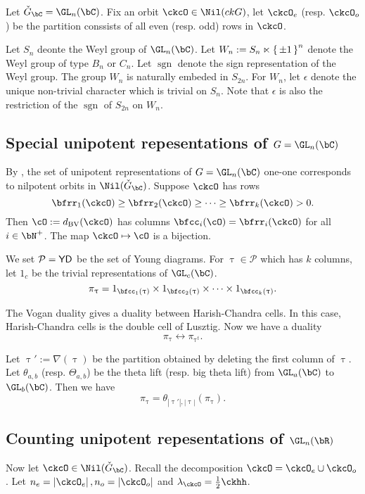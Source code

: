 \documentclass[12pt,a4paper]{amsart}
\def\abs#1{\left|{#1}\right|}
\newcommand{\CP}{{\mathcal {P}}}
\newcommand{\sgn}{\operatorname{sgn}}
\def\DD{\nabla}
\numberwithin{equation}{section}
\theoremstyle{remark}
\def\half{{\tfrac{1}{2}}}
\begin{document}
Let $\ckGc = \GL_n(\bC)$. 
Fix
an orbit $\ckcO\in \Nil(ckG)$, let $\ckcO_e$ (resp. $\ckcO_o$) be the partition
conssists of all even (resp. odd) rows in $\ckcO$.  

Let $S_n$ deonte the Weyl group of $\GL_n(\bC)$. 
Let $W_n := S_n \ltimes \set{\pm 1}^n$ denote the Weyl group of type $B_n$ or $C_n$.  
Let $\sgn$ denote the sign representation of the Weyl group. 
The group $W_n$ is naturally embeded in $S_{2n}$. 
For $W_n$, let $\epsilon$ denote the unique non-trivial character which is trivial on $S_n$. 
Note that $\epsilon$ is also the restriction of the $\sgn$ of $S_{2n}$ on $W_n$. 


\subsection{Special unipotent repesentations of $G = \GL_n(\bC)$}
By \cite{BVUni}, the set of unipotent representations
of $G = \GL_n(\bC)$ one-one corresponds to nilpotent orbits in $\Nil(\ckGc)$. 
Suppose $\ckcO$ has rows 
\[
\bfrr_1(\ckcO)\geq \bfrr_2(\ckcO)\geq \cdots\geq 
\bfrr_k(\ckcO) >0. 
\]
Then $\cO := \dBV(\ckcO)$ has columns $\bfcc_i(\cO) = \bfrr_i(\ckcO)$ for all 
$i\in \bN^+$. 
The map $\ckcO \mapsto \cO$ is a bijection.


We set $\CP =  \YD$ be the set of Young diagrams. 
For $\uptau \in \CP$ which has $k$ columns,
let $1_{c}$ be the trivial representations of $\GL_c(\bC)$. 
\[
 \pi_\uptau = 1_{\bfcc_1(\uptau)}\times  1_{\bfcc_2(\uptau)}\times \cdots 
 \times 1_{\bfcc_k(\uptau)}.
\]

The Vogan duality gives a duality between Harish-Chandra cells. 
In this case, Harish-Chandra cells is the double cell  
of Lusztig.  
Now we have a duality 
\[
 \pi_\uptau \leftrightarrow \pi_{\uptau^t}. 
\]

Let $\uptau' := \DD(\uptau)$ be the partition obtained by deleting the first column 
of $\uptau$. 
Let $\theta_{a,b}$ (resp. $\Theta_{a,b}$) be the  theta lift (resp. big theta lift) from $\GL_a(\bC)$ to  
$\GL_b(\bC)$. 
Then we have 
\[
  \pi_{\uptau} = \theta_{{\abs{\uptau'}},{\abs{\uptau}}} (\pi_{\uptau}). 
\]

\subsection{Counting unipotent repesentations of $\GL_n(\bR)$}
Now let $\ckcO\in \Nil(\ckGc)$. 
Recall the decomposition $\ckcO  = \ckcO_e \cup \ckcO_o$.
Let $n_e = \abs{\ckcO_e}, n_o = \abs{\ckcO_o}$ and $\lambda_\ckcO = \half \ckhh$. 
\end{document}
